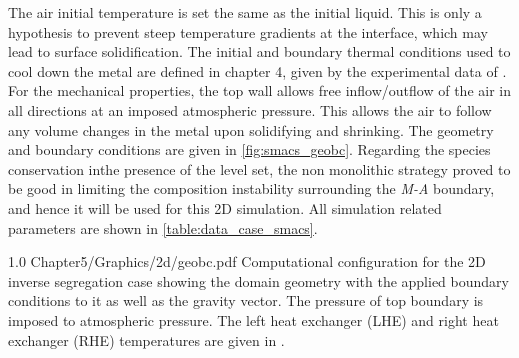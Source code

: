 The air initial temperature is set the same as the initial liquid. This is only a hypothesis to prevent steep temperature gradients at the interface,
which may lead to surface solidification. The initial and boundary thermal conditions used to cool down the metal are defined in chapter 4, given by the experimental
data of \citet{hachani_experimental_2012}. For the mechanical properties, the top wall allows free inflow/outflow of the air in all directions 
at an imposed atmospheric pressure. This allows the air to follow any volume changes in the metal upon solidifying and shrinking. 
The geometry and boundary conditions are given in \cref{fig:smacs_geobc}.
Regarding the species conservation inthe presence of the level set, the non monolithic strategy proved to be good in limiting the composition instability surrounding the \emph{M-A} boundary, and hence it will be used for this 2D simulation.
All simulation related parameters are shown in \cref{table:data_case_smacs}.

\begin{figureth}
{1.0}
{Chapter5/Graphics/2d/geobc.pdf}
{Computational configuration for the 2D inverse segregation case showing the domain geometry 
with the applied boundary conditions to it as well as the gravity vector.
The pressure of top boundary is imposed to atmospheric pressure. The left heat exchanger (LHE)
and right heat exchanger (RHE) temperatures are given in \citep{hachani_experimental_2012}.
}
\label{fig:smacs_geobc}
\end{figureth}

